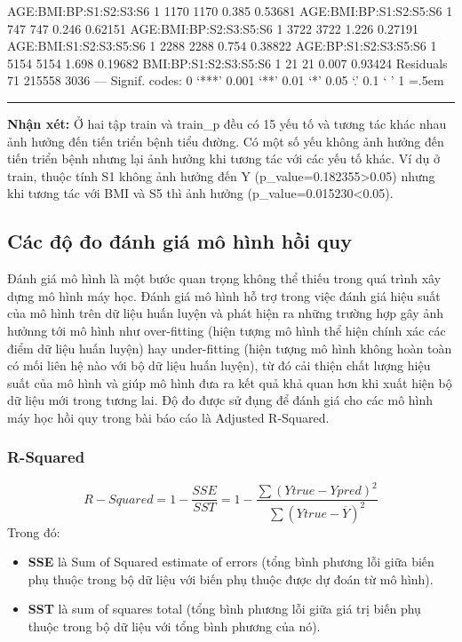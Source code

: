 \documentclass[runningheads]{llncs}
\newenvironment{lcverbatim}
 {\SaveVerbatim{cverb}}
 {\endSaveVerbatim
  \flushleft\fboxrule=0pt\fboxsep=.5em
  \colorbox{cverbbg}{%
    \makebox[\dimexpr\linewidth-2\fboxsep][l]{\BUseVerbatim{cverb}}%
  }
  \endflushleft
}
\begin{document}
\begin{lcverbatim}
AGE:BMI:BP:S1:S2:S3:S6  1   1170    1170   0.385  0.53681    
AGE:BMI:BP:S1:S2:S5:S6  1    747     747   0.246  0.62151    
AGE:BMI:BP:S2:S3:S5:S6  1   3722    3722   1.226  0.27191    
AGE:BMI:S1:S2:S3:S5:S6  1   2288    2288   0.754  0.38822    
AGE:BP:S1:S2:S3:S5:S6   1   5154    5154   1.698  0.19682    
BMI:BP:S1:S2:S3:S5:S6   1     21      21   0.007  0.93424    
Residuals              71 215558    3036                     
---
Signif. codes:  0 ‘***’ 0.001 ‘**’ 0.01 ‘*’ 0.05 ‘.’ 0.1 ‘ ’ 1
\end{lcverbatim}
\hrule
\vspace{0.5cm}

\textbf{Nhận xét:}
Ở hai tập train và train\_p đều có 15 yếu tố và tương tác khác nhau ảnh hưởng đến tiến triển bệnh tiểu đường. Có một số yếu không ảnh hưởng đến tiến triển bệnh nhưng lại ảnh hưởng khi tương tác với các yếu tố khác. Ví dụ ở train, thuộc tính S1 không ảnh hưởng đến Y (p\_value=0.182355>0.05) nhưng khi tương tác với BMI và S5 thì ảnh hưởng (p\_value=0.015230<0.05). 

\subsection{Các độ đo đánh giá mô hình hồi quy}

Đánh giá mô hình là một bước quan trọng không thể thiếu trong quá trình xây dựng mô hình máy học. Đánh giá mô hình hỗ trợ trong việc đánh giá hiệu suất của mô hình trên dữ liệu huấn luyện và phát hiện ra những trường hợp gây ảnh hưởnng tới mô hình như over-fitting (hiện tượng mô hình thể hiện chính xác các điểm dữ liệu huấn luyện) hay under-fitting (hiện tượng mô hình không hoàn toàn có mối liên hệ nào với bộ dữ liệu huấn luyện), từ đó cải thiện chất lượng hiệu suất của mô hình và giúp mô hình đưa ra kết quả khả quan hơn khi xuất hiện bộ dữ liệu mới trong tương lai. Độ đo được sử đụng để đánh giá cho các mô hình máy học hồi quy trong bài báo cáo là Adjusted R-Squared.


\subsubsection{R-Squared}
\begin{equation}
	R-Squared = 1- \frac{SSE}{SST} =  1 - \frac{\sum (Ytrue - Ypred)^2}{\sum (Ytrue - \overline{Y})^2}
\end{equation}
Trong đó:\\
\begin{itemize}
	\item  \textbf{SSE} là Sum of Squared estimate of errors (tổng bình phương lỗi giữa biến phụ thuộc trong bộ dữ liệu với biến phụ thuộc được dự đoán từ mô hình).\\
	\item \textbf{SST} là sum of squares total (tổng bình phương lỗi giữa giá trị biến phụ thuộc trong bộ dữ liệu với tổng bình phương của nó).\\
\end{itemize}
\end{document}
